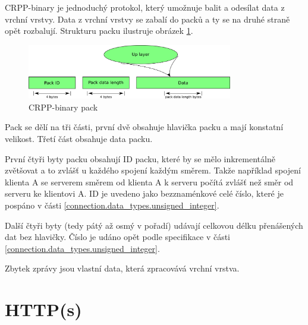 CRPP-binary je jednoduchý protokol, který umožnuje balit a odesílat data z vrchní vrstvy. Data z vrchní vrstvy se zabalí do packů a ty se na druhé straně opět rozbalují. Strukturu packu ilustruje obrázek \ref{down_layer.pictures.CRPP-binary}.

\begin{figure}[h]
  \centering
  \includegraphics[width=0.80\textwidth]{diagrams/CRPP-binary.png}
  \caption{CRPP-binary pack}
  \label{down_layer.pictures.CRPP-binary}
\end{figure}

Pack se dělí na tři části, první dvě obsahuje hlavička packu a mají konstatní velikost. Třetí část obsahuje data packu. 

První čtyři byty packu obsahují ID packu, které by se mělo inkrementálně zvětšovat a to zvlášť u každého spojení každým směrem. Takže například spojení klienta A se serverem směrem od klienta A k serveru počítá zvlášť než směr od serveru ke klientovi A. ID je uvedeno jako bezznaménkové celé číslo, které je pospáno v části \ref{connection.data_types.unsigned_integer}.

Další čtyři byty (tedy pátý až osmý v pořadí) udávají celkovou délku přenášených dat bez hlavičky. Číslo je udáno opět podle specifikace v části \ref{connection.data_types.unsigned_integer}.

Zbytek zprávy jsou vlastní data, která zpracovává vrchní vrstva.

\chapter{HTTP(s)}
\label{down_layer.http}


